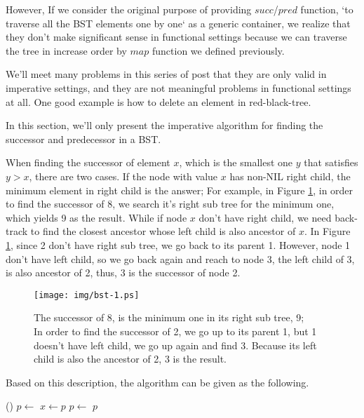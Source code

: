 \documentclass[b5paper]{article}
\begin{document}
However, If we consider
the original purpose of providing $succ$/$pred$ function, `to traverse all the
BST elements one by one` as a generic container, we realize
that they don't make significant sense in functional settings because
we can traverse the tree in increase order by $map$ function we defined
previously.

We'll meet many problems in this series of post that they are only valid
in imperative settings, and they are not meaningful problems in functional
settings at all. One good example is how to delete an element in
red-black-tree\cite{okasaki-blog}.

In this section, we'll only present the imperative algorithm for finding
the successor and predecessor in a BST.

When finding the successor of element $x$, which is the smallest one $y$
that satisfies $y > x$, there are two cases. If the node with value $x$
has non-NIL right child, the minimum element in right child is the answer;
For example, in Figure \ref{fig:bst-succ}, in order to find the successor
of 8, we search it's right sub tree for the minimum one, which yields 9
as the result. While if node $x$ don't have right child, we need
back-track to find the closest ancestor whose left child is also ancestor
of $x$. In Figure \ref{fig:bst-succ}, since 2 don't have right sub tree,
we go back to its parent 1. However, node 1 don't have left child, so we
go back again and reach to node 3, the left child of 3, is also ancestor
of 2, thus, 3 is the successor of node 2.

\begin{figure}[htbp]
  \centering
  \texttt{[image: img/bst-1.ps]}
  \caption{The successor of 8, is the minimum one in its right sub tree, 9; \\
           In order to find the successor of 2, we go up to its parent 1, but 1 doesn't have left child, we go up again and find 3. Because its left child is also the ancestor of 2, 3 is the result.} \label{fig:bst-succ}
\end{figure}

Based on this description, the algorithm can be given as the following.

\begin{algorithmic}[1]
    \State \Return {}()
  \Else
    \State $p \gets $ 
      \State $x \gets p$
      \State $p \gets $ 
    \EndWhile
    \State \Return $p$
  \EndIf
\EndFunction
\end{algorithmic}
\end{document}
